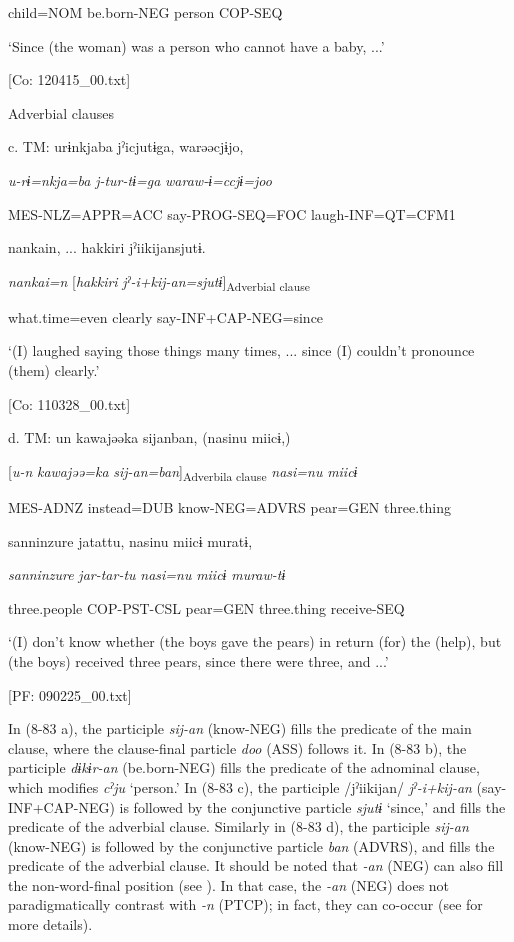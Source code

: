       child=NOM  be.born-NEG  person  COP-SEQ

      ‘Since (the woman) was a person who cannot have a baby, ...’

      [Co: 120415\_00.txt]

  Adverbial clauses

  c.  TM:  urɨnkjaba  jˀicjutɨga,  warəəcjɨjo,

      \textit{u-rɨ=nkja=ba}  \textit{j-tur-tɨ=ga}  \textit{waraw-ɨ=ccjɨ=joo}

      MES-NLZ=APPR=ACC  say-PROG-SEQ=FOC  laugh-INF=QT=CFM1

      {\textbar}nankai{\textbar}n, ...  {\textbar}hakkiri{\textbar}  jˀiikijansjutɨ.

      \textit{nankai=n}  [\textit{hakkiri}  \textit{jˀ-i+kij-an=sjutɨ}]\textsubscript{Adverbial clause}

      what.time=even  clearly  say-INF+CAP-NEG=since

      ‘(I) laughed saying those things many times, ... since (I) couldn’t pronounce (them) clearly.’

      [Co: 110328\_00.txt]

  d.  TM:  un  kawajəəka  sijanban,  (nasinu  miicɨ,)

      [\textit{u-n}  \textit{kawajəə=ka}  \textit{sij-an=ban}]\textsubscript{Adverbila clause}  \textit{nasi=nu}  \textit{miicɨ}

      MES-ADNZ  instead=DUB  know-NEG=ADVRS  pear=GEN  three.thing

      {\textbar}sanninzure{\textbar}  jatattu,  nasinu  miicɨ  muratɨ,

      \textit{sanninzure}  \textit{jar-tar-tu}  \textit{nasi=nu}  \textit{miicɨ}  \textit{muraw-tɨ}

      three.people  COP-PST-CSL  pear=GEN  three.thing  receive-SEQ

      ‘(I) don’t know whether (the boys gave the pears) in return (for) the (help), but (the boys) received three pears, since there were three, and ...’

      [PF: 090225\_00.txt]

In (8-83 a), the participle \textit{sij-an} (know-NEG) fills the predicate of the main clause, where the clause-final particle \textit{doo} (ASS) follows it. In (8-83 b), the participle \textit{dɨkɨr-an} (be.born-NEG) fills the predicate of the adnominal clause, which modifies \textit{cˀju} ‘person.’ In (8-83 c), the participle /jˀiikijan/ \textit{jˀ-i+kij-an} (say-INF+CAP-NEG) is followed by the conjunctive particle \textit{sjutɨ} ‘since,’ and fills the predicate of the adverbial clause. Similarly in (8-83 d), the participle \textit{sij-an} (know-NEG) is followed by the conjunctive particle \textit{ban} (ADVRS), and fills the predicate of the adverbial clause. It should be noted that \textit{{}-an} (NEG) can also fill the non-word-final position (see ). In that case, the \textit{{}-an} (NEG) does not paradigmatically contrast with \textit{{}-n} (PTCP); in fact, they can co-occur (see  for more details).

